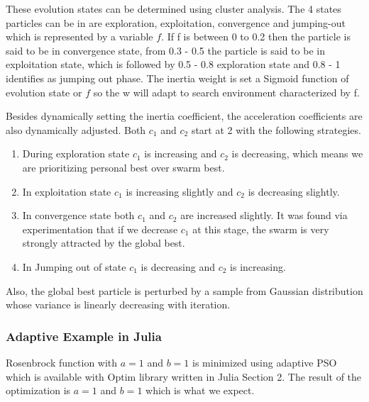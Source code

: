 \documentclass{article}
\begin{document}
These evolution states can be determined using cluster analysis. The 4 states particles can be in are exploration, exploitation, convergence and jumping-out which is represented by a variable $f$. If f is between 0 to 0.2 then the particle is said to be in convergence state, from 0.3 - 0.5 the particle is said to be in exploitation state, which is followed by 0.5 - 0.8 exploration state and 0.8 - 1 identifies as jumping out phase.  The inertia weight is set a Sigmoid function of evolution state or $f$ so the w will adapt to search environment characterized by f.

Besides dynamically setting the inertia coefficient, the acceleration  coefficients are also dynamically adjusted. Both $c_1$ and $c_2$ start at 2 with the following strategies. 
\begin{enumerate}
    \item During exploration state $c_1$ is increasing and $c_2$ is decreasing, which means we are prioritizing personal best over swarm best.
    \item In exploitation state $c_1$ is increasing slightly and $c_2$ is decreasing slightly. 
    \item In convergence state both $c_1$ and $c_2$ are increased slightly. It was found via experimentation that if we decrease $c_1$ at this stage, the swarm is very strongly attracted by the global best.
    \item  In Jumping out of state $c_1$ is decreasing and $c_2$ is increasing.
\end{enumerate}
 Also, the global best particle is perturbed by a sample from Gaussian distribution whose variance is linearly decreasing with iteration.

\subsubsection{Adaptive Example in Julia}
Rosenbrock function with $a = 1$ and $b=1$ is minimized using adaptive PSO which is available with Optim library written in Julia \cite{irfan_2021J} Section 2. The result of the optimization is $a=1$ and $b=1$ which is what we expect.
\end{document}
